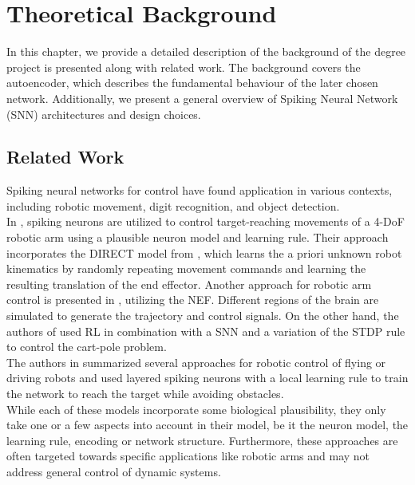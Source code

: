 \chapter{Theoretical Background}
In this chapter, we provide a detailed description of the background of the degree project is presented along with related work. The background covers the autoencoder, which describes the fundamental behaviour of the later chosen network. Additionally, we present a general overview of Spiking Neural Network (\ac{SNN}) architectures and design choices.

\section{Related Work}
Spiking neural networks for control have found application in various contexts, including robotic movement, digit recognition\cite{lee_training_2016}, and object detection\cite{soures_deep_2019,zhou_deep_2020}.\\
In \cite{bouganis_training_2010}, spiking neurons are utilized to control target-reaching movements of a 4-DoF robotic arm using a plausible neuron model and learning rule. Their approach incorporates the DIRECT model from \cite{bullock_self-organizing_1993}, which learns the a priori unknown robot kinematics by randomly repeating movement commands and learning the resulting translation of the end effector. Another approach for robotic arm control is presented in \cite{dewolf_spiking_2016}, utilizing the \ac{NEF}\cite{eliasmith_neural_2004}. Different regions of the brain are simulated to generate the trajectory and control signals. On the other hand, the authors of \cite{liu_spiking_2023} used \ac{RL} in combination with a \ac{SNN} and a variation of the \ac{STDP} rule to control the cart-pole problem.\\
The authors in \cite{bing_supervised_2019} summarized several approaches for robotic control of flying or driving robots and used layered spiking neurons with a local learning rule to train the network to reach the target while avoiding obstacles.\\
While each of these models incorporate some biological plausibility, they only take one or a few aspects into account in their model, be it the neuron model, the learning rule, encoding or network structure. Furthermore, these approaches are often targeted towards specific applications like robotic arms and may not address general control of dynamic systems.\\

